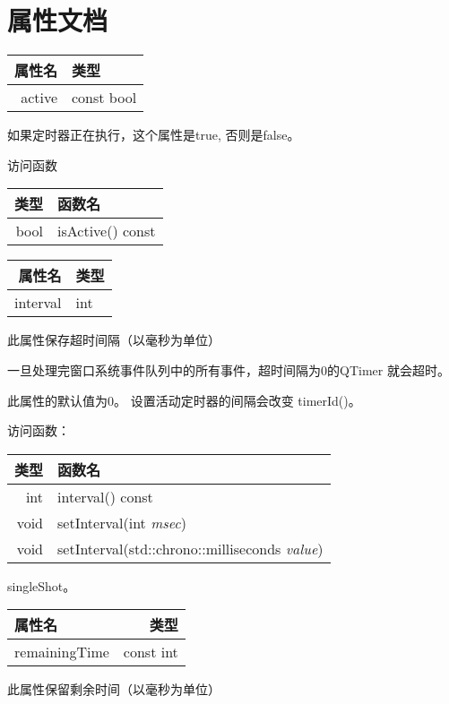 \section{属性文档}

\begin{tabular}{|r|l|}
	\hline
	属性名&	类型 \\ 
	\hline
active&	const bool \\ 
	\hline 
\end{tabular}

如果定时器正在执行，这个属性是true, 否则是false。

访问函数

\begin{tabular}{|r|l|}
	\hline
类型 &	函数名 \\ 
\hline
bool	& isActive() const \\ 
	\hline 
\end{tabular}

\begin{tabular}{|r|l|}
	\hline
属性名	 & 类型 \\
\hline
interval & 	int \\
	\hline 
\end{tabular}

此属性保存超时间隔（以毫秒为单位）

一旦处理完窗口系统事件队列中的所有事件，超时间隔为0的QTimer 就会超时。

此属性的默认值为0。 设置活动定时器的间隔会改变 timerId()。

访问函数：

\begin{tabular}{|r|l|}
	\hline
类型	 & 函数名 \\
\hline
int & 	interval() const \\
\hline
void	 & setInterval(int \emph{msec}) \\
\hline
void &	setInterval(std::chrono::milliseconds \emph{value}) \\
	\hline 
\end{tabular}


\begin{seeAlso}
singleShot。
\end{seeAlso}

\begin{tabular}{|l|r|}
\hline
属性名	 & 类型 \\ 
\hline
remainingTime	& const int \\ 
\hline
\end{tabular}

此属性保留剩余时间（以毫秒为单位）


